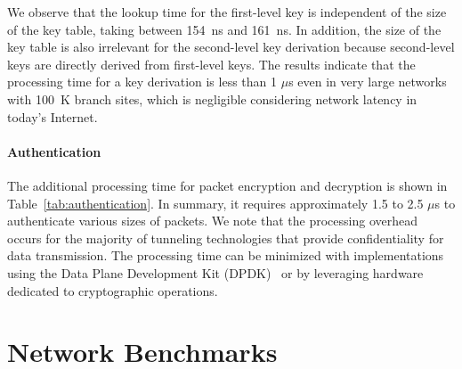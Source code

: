 We observe that the lookup time for the first-level key is independent of the size of the key
table, taking between \SI{154}{ns} and \SI{161}{ns}. In addition, the size of the key table is
also irrelevant for the second-level key derivation
because second-level keys are directly derived from first-level keys.
The results indicate that the processing time for a key derivation is less than 1 $\mu$s
even in very large networks with \SI{100}{K} branch sites, which is negligible considering
network latency in today's Internet.


\paragraph{Authentication}
The additional processing time for packet encryption and decryption is shown in
Table~\ref{tab:authentication}. In summary, it requires approximately 1.5 to 2.5 $\mu$s to
authenticate various sizes of packets. We note that the processing overhead occurs for the majority
of tunneling technologies that provide confidentiality for data transmission. The processing
time can be minimized with implementations using the Data Plane Development Kit (DPDK)~\cite{dpdk} or by leveraging hardware dedicated to cryptographic operations.



\section{Network Benchmarks}
\label{sec:networkbenchmark}

